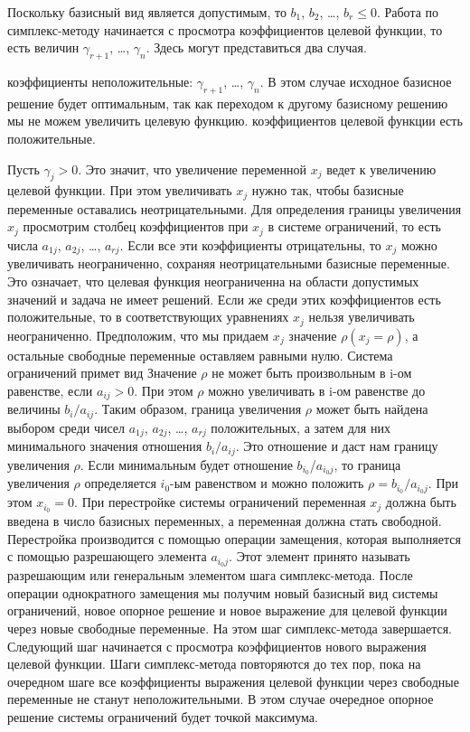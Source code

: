 \documentclass{article}
\begin{document}
Поскольку базисный вид является допустимым, то $b_1$, $b_2$, \dots, $b_r \leq 0$. Работа по симплекс-методу начинается с просмотра коэффициентов целевой функции, то есть величин $\gamma_{r+1}$, \dots, $\gamma_n$. Здесь могут представиться два случая.
		\begin{enumerate}
			\renewcommand{\theenumi}{(\arabic{enumi})}
			\renewcommand{\labelenumi}{\arabic{enumi})}
			 коэффициенты неположительные: $\gamma_{r+1}$, \dots, $\gamma_n$. В этом случае исходное базисное решение будет оптимальным, так как переходом к другому базисному решению мы не можем увеличить целевую функцию.
			 коэффициентов целевой функции есть положительные.
		\end{enumerate}

Пусть $\gamma_j > 0$. Это значит, что увеличение переменной $x_j$ ведет к увеличению целевой функции. При этом увеличивать $x_j$ нужно так, чтобы базисные переменные оставались неотрицательными. Для определения границы увеличения $x_j$ просмотрим столбец коэффициентов при $x_j$ в системе ограничений, то есть числа
$a_{1j}$, $a_{2j}$, \dots, $a_{rj}$. Если все эти коэффициенты отрицательны, то $x_j$ можно увеличивать неограниченно, сохраняя неотрицательными базисные переменные. Это означает, что целевая функция неограниченна на области допустимых значений и задача не имеет решений. Если же среди этих коэффициентов есть положительные, то в соответствующих уравнениях $x_j$ нельзя увеличивать неограниченно. Предположим, что мы придаем $x_j$ значение $\rho  (x_j = \rho)$, а остальные свободные переменные оставляем равными нулю. Система ограничений примет вид
Значение $\rho$ не может быть произвольным в i-ом равенстве, если $a_{ij}>0$. При этом $\rho$ можно увеличивать в i-ом равенстве до величины $b_i/a_{ij}$. Таким образом, граница увеличения $\rho$ может быть найдена выбором среди чисел $a_{1j}$, $a_{2j}$, \dots, $a_{rj}$ положительных, а затем для них минимального значения отношения $b_i/a_{ij}$. Это отношение и даст нам границу увеличения $\rho$. Если минимальным будет отношение $b_{i_0}$/$a_{i_0j}$, то граница увеличения $\rho$ определяется $i_0$-ым равенством и можно положить $\rho = b_{i_0}/a_{i_0j}$. При этом $x_{i_0} = 0$.  При перестройке системы ограничений переменная $x_j$ должна быть введена в число базисных переменных, а переменная  должна стать свободной. Перестройка производится с помощью операции замещения, которая выполняется с помощью разрешающего элемента $a_{i_0j}$. Этот элемент принято называть разрешающим или генеральным элементом шага симплекс-метода. После операции однократного замещения мы получим новый базисный вид системы ограничений, новое опорное решение и новое выражение для целевой функции через новые свободные переменные. На этом шаг симплекс-метода завершается. Следующий шаг начинается с просмотра коэффициентов нового выражения целевой функции. Шаги симплекс-метода повторяются до тех пор, пока на очередном шаге все коэффициенты выражения целевой функции через свободные переменные не станут неположительными. В этом случае очередное опорное решение системы ограничений будет точкой максимума.
\end{document}
